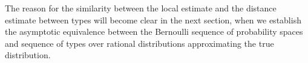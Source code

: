   The reason for the similarity between the local estimate and the
  distance estimate between types will become clear in the next
  section, when we establish the asymptotic equivalence between the
  Bernoulli sequence of probability spaces and sequence of types over
  rational distributions approximating the true distribution.
